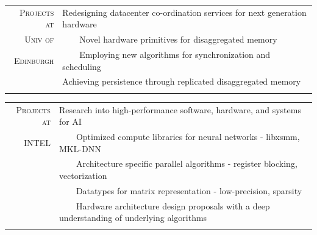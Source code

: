 \documentclass[a4paper,10pt]{article} %
\newcommand{\tabitem}{~~\llap{\textbullet}~~}
\begin{document}
\begin{tabular}{rp{12cm}}
	\textsc{Projects at} & Redesigning datacenter co-ordination services for next generation hardware \\
	\textsc{Univ of} & \tabitem Novel hardware primitives for disaggregated memory \\
	\textsc{Edinburgh}& \tabitem Employing new algorithms for synchronization and scheduling \\
	& Achieving persistence through replicated disaggregated memory \\
	& \\
\end{tabular}


\begin{tabular}{rp{12cm}}
	\textsc{Projects at}  & Research into high-performance software, hardware, and systems for AI \\
	\textsc{INTEL} &   \tabitem Optimized compute libraries for neural networks - libxsmm, MKL-DNN \\
	& \tabitem Architecture specific parallel algorithms - register blocking, vectorization  \\
	& \tabitem Datatypes for matrix representation - low-precision, sparsity \\
	& \tabitem Hardware architecture design proposals with a deep understanding of underlying algorithms\\
	&\\
\end{tabular}
\end{document}
